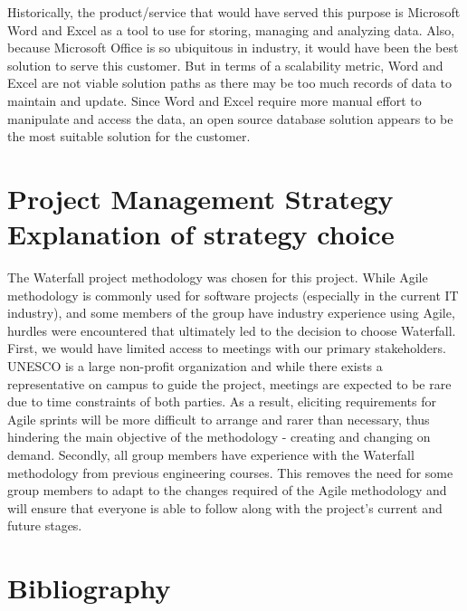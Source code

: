\documentclass[11pt]{article}
\begin{document}
Historically, the product/service that would have served this purpose is Microsoft Word and Excel as a tool to use for storing, managing and analyzing data. Also, because Microsoft Office is so ubiquitous in industry, it would have been the best solution to serve this customer. But in terms of a scalability metric, Word and Excel are not viable solution paths as there may be too much records of data to maintain and update. Since Word and Excel require more manual effort to manipulate and access the data, an open source database solution appears to be the most suitable solution for the customer. \\

\newpage

\section{Project Management Strategy Explanation of strategy choice}

The Waterfall project methodology was chosen for this project. While Agile methodology is commonly used for software projects (especially in the current IT industry), and some members of the group have industry experience using Agile, hurdles were encountered that ultimately led to the decision to choose Waterfall. First, we would have limited access to meetings with our primary stakeholders. UNESCO is a large non-profit organization and while there exists a representative on campus to guide the project, meetings are expected to be rare due to time constraints of both parties. As a result, eliciting requirements for Agile sprints will be more difficult to arrange and rarer than necessary, thus hindering the main objective of the methodology - creating and changing on demand. Secondly, all group members have experience with the Waterfall methodology from previous engineering courses. This removes the need for some group members to adapt to the changes required of the Agile methodology and will ensure that everyone is able to follow along with the project's current and future stages. \\

\newpage
\section{Bibliography}
\printbibliography
\end{document}
